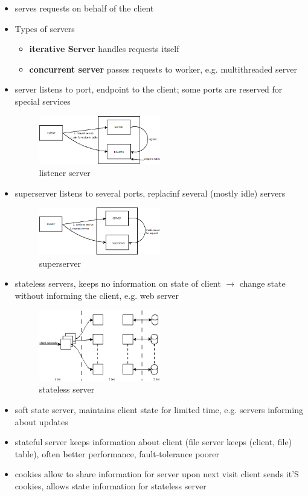 \documentclass[ngerman,a4paper]{report}
\begin{document}
\begin{itemize}
	\item serves requests on behalf of the client
	\item Types of servers\\
		\begin{itemize}
			\item \textbf{iterative Server} handles requests itself
			\item \textbf{concurrent server} passes requests to worker, e.g. multithreaded server
		\end{itemize}
	\item server listens to port, endpoint to the client; some ports are reserved for special services
\begin{figure}[h]
	\centering
	\includegraphics[width=200px]{gfx/server_deamon.png}
	\caption{listener server}
	\label{img:listener}
\end{figure}
	\item superserver listens to several ports, replacinf several (mostly idle) servers
\begin{figure}[h]
	\centering
	\includegraphics[width=200px]{gfx/superserver.png}
	\caption{superserver}
	\label{img:supserv}
\end{figure}
	\item stateless servers, keeps no information on state of client $\rightarrow$ change state without informing the client, e.g. web server
\begin{figure}[h]
	\centering
	\includegraphics[width=200px]{gfx/server3.png}
	\caption{stateless server}
	\label{img:statel_serv}
\end{figure}
	\item soft state server, maintains client state for limited time, e.g. servers informing about updates
	\item stateful server keeps information about client (file server keeps (client, file) table), often better performance, fault-tolerance poorer
	\item cookies allow to share information for server upon next visit client sends it'S cookies, allows state information for stateless server

\end{itemize}
\end{document}
